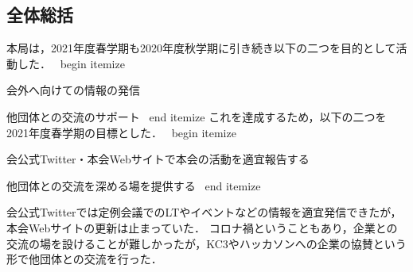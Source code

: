 \subsection*{全体総括}


本局は，2021年度春学期も2020年度秋学期に引き続き以下の二つを目的として活動した．
\ begin { itemize }
	\item 会外へ向けての情報の発信
	\item 他団体との交流のサポート
\ end { itemize }
これを達成するため，以下の二つを2021年度春学期の目標とした．
\ begin { itemize }
	\item 会公式Twitter・本会Webサイトで本会の活動を適宜報告する
	\item 他団体との交流を深める場を提供する
\ end { itemize }

会公式Twitterでは定例会議でのLTやイベントなどの情報を適宜発信できたが，本会Webサイトの更新は止まっていた．
コロナ禍ということもあり，企業との交流の場を設けることが難しかったが，KC3やハッカソンへの企業の協賛という形で他団体との交流を行った．